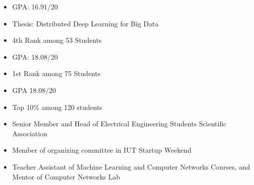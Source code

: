 \documentclass[10pt,a4paper]{altacv}
\begin{document}
\begin{paracol}{2}
\vspace*{-.5\multicolsep}


%



\begin{itemize}
	\item GPA: 16.91/20
	\item Thesis: Distributed Deep Learning for Big Data
	\item 4th Rank among 53 Students
\end{itemize}
\divider

\begin{itemize}
	\item GPA: 18.08/20
	\item 1st Rank among 75 Students
\end{itemize}
\divider

\begin{itemize}
	\item GPA 18.08/20
	\item Top 10\% among 120 students
\end{itemize}


\begin{itemize}
	\item  \small{Senior Member and Head of Electrical Engineering Students Scientific Association}
	\item \small{Member of organizing committee in IUT Startup Weekend}
	\item \small{Teacher Assistant of Machine Learning and Computer Networks Courses, and Mentor of Computer Networks Lab}
\end{itemize}


\end{paracol}
\end{document}
